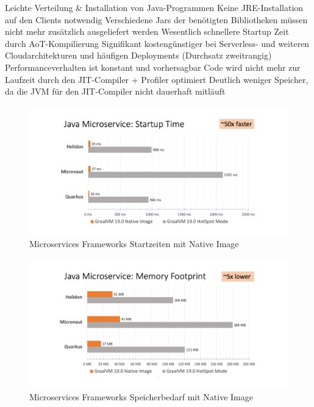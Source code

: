 Leichte Verteilung \& Installation von Java-Programmen
Keine JRE-Installation auf den Clients notwendig
Verschiedene Jars der benötigten Bibliotheken müssen nicht mehr zusätzlich ausgeliefert werden
Wesentlich schnellere Startup Zeit durch AoT-Kompilierung
Signifikant kostengünstiger bei Serverless- und weiteren Cloudarchitekturen und häufigen Deployments (Durchsatz zweitrangig)
Performanceverhalten ist konstant und vorhersagbar
Code wird nicht mehr zur Laufzeit durch den JIT-Compiler + Profiler optimiert
Deutlich weniger Speicher, da die JVM für den JIT-Compiler nicht dauerhaft mitläuft


\begin{figure}[h]
	\centering
	\includegraphics[width=1\textwidth]{resources/ms_startup_time.png}
	\caption{Microservices Frameworks Startzeiten mit Native Image \cite{GraalVMBenchmarks}}
	\label{fig:system_startuptime}
\end{figure}

\begin{figure}[h]
	\centering
	\includegraphics[width=1\textwidth]{resources/ms_memory_footprint.png}
	\caption{Microservices Frameworks Speicherbedarf mit Native Image \cite{GraalVMBenchmarks}}
	\label{fig:system_memory_footprint}
\end{figure}


